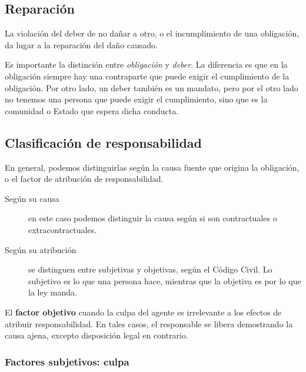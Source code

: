 \documentclass[../main.tex]{subfiles}
\begin{document}
\subsection{Reparación}

La violación del deber de no dañar a otro, o el incumplimiento de una
obligación, da lugar a la reparación del daño causado.

Es importante la distinción entre \textit{obligación} y \textit{deber}. La diferencia
es que en la obligación siempre hay una contraparte que puede exigir el 
cumplimiento de la obligación. Por otro lado, un deber también es un mandato,
pero por el otro lado no tenemos una persona que puede exigir el cumplimiento,
sino que es la comunidad o Estado que espera dicha conducta.

\subsection{Clasificación de responsabilidad}

En general, podemos distinguirlas según la causa fuente que origina la obligación,
o el factor de atribución de responsabilidad.

\begin{description}
  \item[Según su causa] en este caso podemos distinguir la causa según si son 
    contractuales o extracontractuales. 
    
  \item[Según su atribución] se distinguen entre subjetivas y objetivas, según
    el Código Civil. Lo subjetivo es lo que una persona hace, mientras que 
    la objetiva es por lo que la ley manda.
\end{description}

El \textbf{factor objetivo} cuando la culpa del agente es irrelevante a los
efectos de atribuir responsabilidad. En tales casos, el responsable se libera
demostrando la causa ajena, excepto disposición legal en contrario.

\subsubsection{Factores subjetivos: culpa}

\vspace{0.333cm}
\begin{center}
\end{center}
\vspace{0.3cm}
\end{document}
